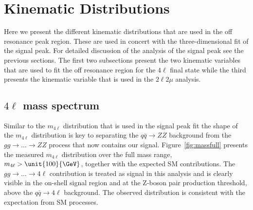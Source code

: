 \section{Kinematic Distributions}
\label{sec:Width_Kin_Dists}

Here we present the different kinematic distributions that are used in the off resonance peak region. These are used in concert with the three-dimensional fit of the signal peak. For detailed discussion of the analysis of the signal peak see the previous sections. The first two subsections present the two kinematic variables that are used to fit the off resonance region for the $4\ell$ final state while the third presents the kinematic variable that is used in the $2\ell2\mu$ analysis.

\subsection{$4\ell$ mass spectrum}
\label{sec:width_m4l_spectrum}

Similar to the $m_{4\ell}$ distribution that is used in the signal peak fit the shape of the $m_{4\ell}$ distribution is key to separating the $q\bar{q} \to ZZ$ background from the $gg \to \ldots \to ZZ$ process that now contains our signal. Figure~\ref{fig:massfull} presents the measured $m_{4\ell}$ distribution over the full mass range, $m_{4\ell} > \unit{100}{\GeV}$, together with the expected SM contributions. The $gg \to \ldots \to 4\ell$ contribution is treated as signal in this analysis and is clearly visible in the on-shell signal region and at the Z-boson pair production threshold, above the $q\bar{q} \to 4\ell$ background. The observed distribution is consistent with the expectation from SM processes.


